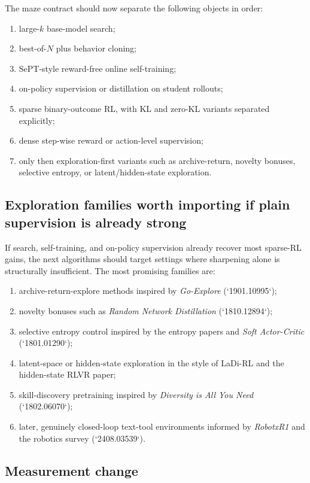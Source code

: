 \documentclass[11pt]{article}
\begin{document}
The maze contract should now separate the following objects in order:

\begin{enumerate}
\item large-$k$ base-model search;
\item best-of-$N$ plus behavior cloning;
\item SePT-style reward-free online self-training;
\item on-policy supervision or distillation on student rollouts;
\item sparse binary-outcome RL, with KL and zero-KL variants separated explicitly;
\item dense step-wise reward or action-level supervision;
\item only then exploration-first variants such as archive-return, novelty bonuses, selective entropy, or latent/hidden-state exploration.
\end{enumerate}

\subsection*{Exploration families worth importing if plain supervision is already strong}

If search, self-training, and on-policy supervision already recover most sparse-RL gains, the next algorithms should target settings where sharpening alone is structurally insufficient. The most promising families are:

\begin{enumerate}
\item archive-return-explore methods inspired by \emph{Go-Explore} (`1901.10995`);
\item novelty bonuses such as \emph{Random Network Distillation} (`1810.12894`);
\item selective entropy control inspired by the entropy papers and \emph{Soft Actor-Critic} (`1801.01290`);
\item latent-space or hidden-state exploration in the style of LaDi-RL and the hidden-state RLVR paper;
\item skill-discovery pretraining inspired by \emph{Diversity is All You Need} (`1802.06070`);
\item later, genuinely closed-loop text-tool environments informed by \emph{RobotxR1} and the robotics survey (`2408.03539`).
\end{enumerate}

\subsection*{Measurement change}
\end{document}

